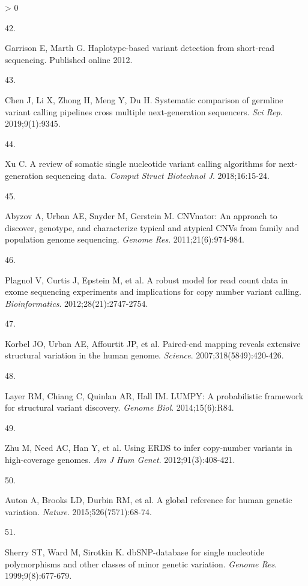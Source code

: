 \documentclass[11pt,letterpaper,oneside]{book}
\newlength{\cslhangindent}
\newlength{\csllabelwidth}
\newenvironment{CSLReferences}[3] %
 {%
  \setlength{\parindent}{0pt}
  \ifodd #1 \everypar{\setlength{\hangindent}{\cslhangindent}}\ignorespaces\fi
  \ifnum #2 > 0
  \setlength{\parskip}{#2\baselineskip}
  \fi
 }%
 {}
\newcommand{\CSLLeftMargin}[1]{\parbox[t]{\maxof{\widthof{#1}}{\csllabelwidth}}{#1}}
\newcommand{\CSLRightInline}[1]{\parbox[t]{\linewidth-\csllabelwidth}{#1}\newline}
\begin{document}
\begin{CSLReferences}{0}{0}
\leavevmode\hypertarget{ref-garrison:2012aa}{}%
\CSLLeftMargin{42. }
\CSLRightInline{Garrison E, Marth G. Haplotype-based variant detection from short-read sequencing. Published online 2012.}

\leavevmode\hypertarget{ref-chen:2019aa}{}%
\CSLLeftMargin{43. }
\CSLRightInline{Chen J, Li X, Zhong H, Meng Y, Du H. Systematic comparison of germline variant calling pipelines cross multiple next-generation sequencers. \emph{Sci Rep}. 2019;9(1):9345.}

\leavevmode\hypertarget{ref-xu:2018aa}{}%
\CSLLeftMargin{44. }
\CSLRightInline{Xu C. A review of somatic single nucleotide variant calling algorithms for next-generation sequencing data. \emph{Comput Struct Biotechnol J}. 2018;16:15-24.}

\leavevmode\hypertarget{ref-abyzov:2011aa}{}%
\CSLLeftMargin{45. }
\CSLRightInline{Abyzov A, Urban AE, Snyder M, Gerstein M. CNVnator: An approach to discover, genotype, and characterize typical and atypical CNVs from family and population genome sequencing. \emph{Genome Res}. 2011;21(6):974-984.}

\leavevmode\hypertarget{ref-plagnol:2012aa}{}%
\CSLLeftMargin{46. }
\CSLRightInline{Plagnol V, Curtis J, Epstein M, et al. A robust model for read count data in exome sequencing experiments and implications for copy number variant calling. \emph{Bioinformatics}. 2012;28(21):2747-2754.}

\leavevmode\hypertarget{ref-korbel:2007aa}{}%
\CSLLeftMargin{47. }
\CSLRightInline{Korbel JO, Urban AE, Affourtit JP, et al. Paired-end mapping reveals extensive structural variation in the human genome. \emph{Science}. 2007;318(5849):420-426.}

\leavevmode\hypertarget{ref-layer:2014aa}{}%
\CSLLeftMargin{48. }
\CSLRightInline{Layer RM, Chiang C, Quinlan AR, Hall IM. LUMPY: A probabilistic framework for structural variant discovery. \emph{Genome Biol}. 2014;15(6):R84.}

\leavevmode\hypertarget{ref-zhu:2012aa}{}%
\CSLLeftMargin{49. }
\CSLRightInline{Zhu M, Need AC, Han Y, et al. Using ERDS to infer copy-number variants in high-coverage genomes. \emph{Am J Hum Genet}. 2012;91(3):408-421.}

\leavevmode\hypertarget{ref-auton:2015aa}{}%
\CSLLeftMargin{50. }
\CSLRightInline{Auton A, Brooks LD, Durbin RM, et al. A global reference for human genetic variation. \emph{Nature}. 2015;526(7571):68-74.}

\leavevmode\hypertarget{ref-sherry:1999aa}{}%
\CSLLeftMargin{51. }
\CSLRightInline{Sherry ST, Ward M, Sirotkin K. dbSNP-database for single nucleotide polymorphisms and other classes of minor genetic variation. \emph{Genome Res}. 1999;9(8):677-679.}


\end{CSLReferences}
\end{document}
